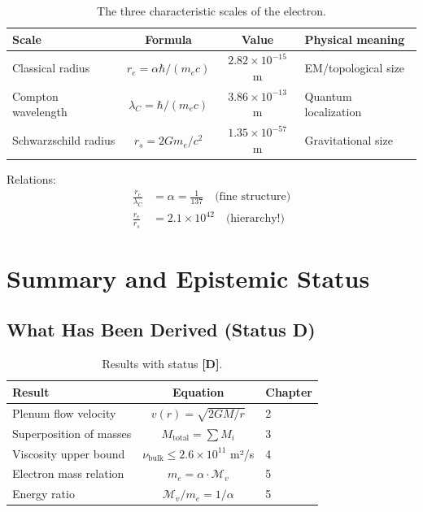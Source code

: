 \documentclass[12pt,a4paper,openany]{book}
\theoremstyle{definition}
\theoremstyle{plain}
\theoremstyle{remark}
\newcommand{\Mv}{\mathcal{M}_v}           %
\newcommand{\re}{r_e}                      %
\newcommand{\nubulk}{\nu_{\text{bulk}}}    %
\newcommand{\derived}{\textcolor{derivedcolor}{\textbf{[D]}}}
\begin{document}
\begin{table}[H]
\centering
\begin{tabular}{|l|c|c|l|}
\hline
\textbf{Scale} & \textbf{Formula} & \textbf{Value} & \textbf{Physical meaning} \\
\hline
Classical radius & $\re = \alpha\hbar/(m_e c)$ & $2.82 \times 10^{-15}$ m & EM/topological size \\
Compton wavelength & $\lambda_C = \hbar/(m_e c)$ & $3.86 \times 10^{-13}$ m & Quantum localization \\
Schwarzschild radius & $r_s = 2Gm_e/c^2$ & $1.35 \times 10^{-57}$ m & Gravitational size \\
\hline
\end{tabular}
\caption{The three characteristic scales of the electron.}
\end{table}

Relations:
\begin{align}
\frac{\re}{\lambda_C} &= \alpha = \frac{1}{137} \quad \text{(fine structure)} \\
\frac{\re}{r_s} &= 2.1 \times 10^{42} \quad \text{(hierarchy!)}
\end{align}

\chapter{Summary and Epistemic Status}

\section{What Has Been Derived (Status D)}

\begin{table}[H]
\centering
\begin{tabular}{|l|c|l|}
\hline
\textbf{Result} & \textbf{Equation} & \textbf{Chapter} \\
\hline
Plenum flow velocity & $v(r) = \sqrt{2GM/r}$ & 2 \\
Superposition of masses & $M_{\text{total}} = \sum M_i$ & 3 \\
Viscosity upper bound & $\nubulk \leq 2.6 \times 10^{11}$ m²/s & 4 \\
Electron mass relation & $m_e = \alpha \cdot \Mv$ & 5 \\
Energy ratio & $\Mv/m_e = 1/\alpha$ & 5 \\
\hline
\end{tabular}
\caption{Results with status \derived{}.}
\end{table}
\end{document}
